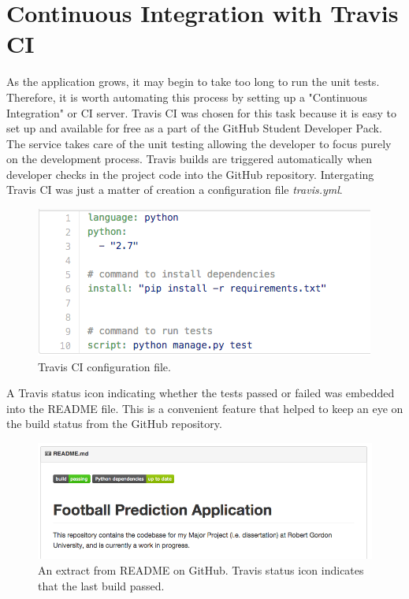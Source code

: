 \section{Continuous Integration with Travis CI}
\label{sec:travis_test}
As the application grows, it may begin to take too long to run the unit tests. Therefore, it is worth automating this process by setting up a "Continuous Integration" or CI server. Travis CI was chosen for this task because it is easy to set up and available for free as a part of the GitHub Student Developer Pack.
The service takes care of the unit testing allowing the developer to focus purely on the development process. Travis builds are triggered automatically when developer checks in the project code into the GitHub repository. Intergating Travis CI was just a matter of creation a configuration file \emph{travis.yml}.

\begin{figure}[H]
	\begin{center}
		\includegraphics[width=.60\textwidth]{testing/images/travisYml}
		\caption{Travis CI configuration file.}
		\label{fig:using:travisyml}
\end{center}
\end{figure}
	
A Travis status icon indicating whether the tests passed or failed was embedded into the README file. This is a convenient feature that helped to keep an eye on the build status from the GitHub repository.

\begin{figure}[H]
	\begin{center}
		\includegraphics[width=.90\linewidth,natwidth=610,natheight=642]{testing/images/travisBadge}
		\caption{An extract from README on GitHub. Travis status icon indicates that the last build passed.}
		\label{fig:using:travisbadge}
	\end{center}
\end{figure}


